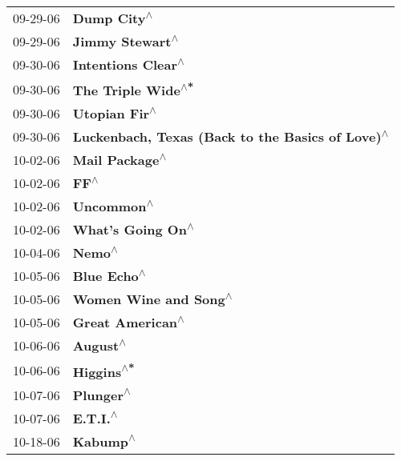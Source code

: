 \begin{supertabular}{p{0.25\columnwidth}p{0.75\columnwidth}}
 09-29-06 &                                       \textbf{Dump City\textsuperscript{$\wedge$}} \\
 09-29-06 &                                   \textbf{Jimmy Stewart\textsuperscript{$\wedge$}} \\
 09-30-06 &                                \textbf{Intentions Clear\textsuperscript{$\wedge$}} \\
 09-30-06 &                                \textbf{The Triple Wide\textsuperscript{$\wedge$*}} \\
 09-30-06 &                                     \textbf{Utopian Fir\textsuperscript{$\wedge$}} \\
 09-30-06 &  \textbf{Luckenbach, Texas (Back to the Basics of Love)\textsuperscript{$\wedge$}} \\
 10-02-06 &                                    \textbf{Mail Package\textsuperscript{$\wedge$}} \\
 10-02-06 &                                              \textbf{FF\textsuperscript{$\wedge$}} \\
 10-02-06 &                                        \textbf{Uncommon\textsuperscript{$\wedge$}} \\
 10-02-06 &                                 \textbf{What's Going On\textsuperscript{$\wedge$}} \\
 10-04-06 &                                            \textbf{Nemo\textsuperscript{$\wedge$}} \\
 10-05-06 &                                       \textbf{Blue Echo\textsuperscript{$\wedge$}} \\
 10-05-06 &                             \textbf{Women Wine and Song\textsuperscript{$\wedge$}} \\
 10-05-06 &                                  \textbf{Great American\textsuperscript{$\wedge$}} \\
 10-06-06 &                                          \textbf{August\textsuperscript{$\wedge$}} \\
 10-06-06 &                                        \textbf{Higgins\textsuperscript{$\wedge$*}} \\
 10-07-06 &                                         \textbf{Plunger\textsuperscript{$\wedge$}} \\
 10-07-06 &                                          \textbf{E.T.I.\textsuperscript{$\wedge$}} \\
 10-18-06 &                                          \textbf{Kabump\textsuperscript{$\wedge$}} \\

\end{supertabular}
